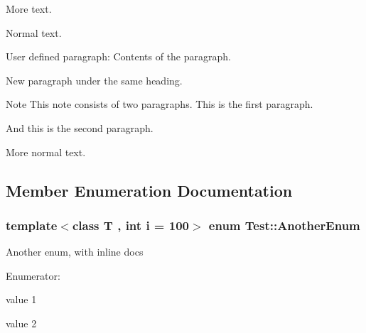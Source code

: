 More text.

Normal text.

\begin{DoxyParagraph}{User defined paragraph\-:}
Contents of the paragraph.
\end{DoxyParagraph}
\begin{DoxyParagraph}{}
New paragraph under the same heading.
\end{DoxyParagraph}
\begin{DoxyNote}{Note}
This note consists of two paragraphs. This is the first paragraph.
\end{DoxyNote}
\begin{DoxyParagraph}{}
And this is the second paragraph.
\end{DoxyParagraph}
More normal text. 

\subsection{Member Enumeration Documentation}
\hypertarget{class_test_a34b5b35cdcd492c108e62275d647bcf4}{
\subsubsection[{Another\-Enum}]{\setlength{\rightskip}{0pt plus 5cm}template$<$class T , int i = 100$>$ enum {\bf Test\-::\-Another\-Enum}}}\label{class_test_a34b5b35cdcd492c108e62275d647bcf4}
Another enum, with inline docs \begin{Desc}
\item[Enumerator\-: ]\par
\begin{description}
\item[{\em 
\hypertarget{class_test_a34b5b35cdcd492c108e62275d647bcf4a5e2c48aa2737365d177cfd29c88341f7}{V1}\label{class_test_a34b5b35cdcd492c108e62275d647bcf4a5e2c48aa2737365d177cfd29c88341f7}
}]value 1 \item[{\em 
\hypertarget{class_test_a34b5b35cdcd492c108e62275d647bcf4adb6734947779033dd3662483baa57be8}{V2}\label{class_test_a34b5b35cdcd492c108e62275d647bcf4adb6734947779033dd3662483baa57be8}
}]value 2 \end{description}
\end{Desc}

